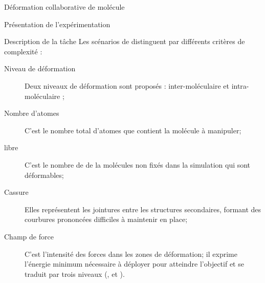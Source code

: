 \documentclass[myfrancais,ngerman,english,french]{mythesis}
\begin{document}
\begin{mychapter}{Déformation collaborative de molécule}
\begin{mysection}{Présentation de l'expérimentation}
\begin{mysubsection}{Description de la tâche}
				Les scénarios de distinguent par différents critères de complexité :
				\begin{description}
					\item[Niveau de déformation] Deux niveaux de déformation sont proposés : inter-moléculaire et intra-moléculaire ;
					\item[Nombre d'atomes] C'est le nombre total d'atomes que contient la molécule à manipuler;
					\item[ libre] C'est le nombre de  de la molécules non fixés dans la simulation qui sont déformables;
					\item[Cassure] Elles représentent les jointures entre les structures secondaires, formant des courbures prononcées difficiles à maintenir en place;
					\item[Champ de force] C'est l'intensité des forces dans les zones de déformation; il exprime l'énergie minimum nécessaire à déployer pour atteindre l'objectif et se traduit par trois niveaux (,  et ).
				\end{description}


\end{mysubsection}
\end{mysection}
\end{mychapter}
\end{document}
